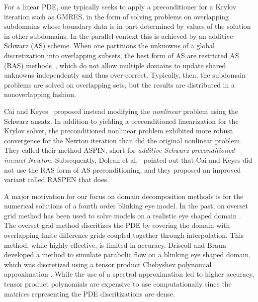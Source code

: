 For a linear PDE, one typically seeks to apply a preconditioner for a Krylov iteration such as GMRES, in the form of solving problems on overlapping subdomains whose boundary data is in part determined by values of the solution in other subdomains. In the parallel context this is achieved by an additive Schwarz (AS) scheme. When one partitions the unknowns of a global discretization into overlapping subsets, the best form of AS are restricted AS (RAS) methods~\cite{Cai1999}, which do not allow multiple domains to update shared unknowns independently and thus over-correct. Typically, then, the subdomain problems are solved on overlapping sets, but the results are distributed in a nonoverlapping fashion. 
%

Cai and Keyes~\cite{Cai2002} proposed instead modifying the \emph{nonlinear} problem using the Schwarz ansatz. In addition to yielding a preconditioned linearization for the Krylov solver, the preconditioned nonlinear problem exhibited more robust convergence for the Newton iteration than did the original nonlinear problem. They called their method ASPIN, short for \textit{additive Schwarz preconditioned inexact Newton}. Subsequently, Dolean et al.~\cite{Dolean2016} pointed out that Cai and Keyes did not use the RAS form of AS preconditioning, and they proposed an improved variant called RASPEN that does. %

A major motivation for our focus on domain decomposition methods is for the numerical solutions of a fourth order blinking eye model. In the past, on overset grid method has been used to solve models on a realistic eye shaped domain \cite{chesshire1990composite,henshaw1998ogen,li2012model,li2015computed}. The overset grid method discritizes the PDE by covering the domain with overlapping finite difference grids coupled together through interpolation. This method, while highly effective, is limited in accuracy. Driscoll and Braun developed a method to simulate parabolic flow on a blinking eye shaped domain, which was discretized using a tensor product Chebyshev polynomial approximation \cite{driscoll2018simulation}. While the use of a spectral approximation led to higher accuracy, tensor product polynomials are expensive to use computationally since the matrices representing the PDE discritizations are dense.

